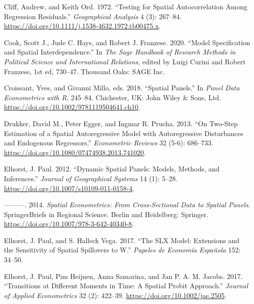 \documentclass[
  letterpaper,
]{scrbook}
\newlength{\cslhangindent}
\newlength{\cslentryspacingunit} %
\newenvironment{CSLReferences}[2] %
 {%
  \setlength{\parindent}{0pt}
  \ifodd #1
  \let\oldpar\par
  \def\par{\hangindent=\cslhangindent\oldpar}
  \fi
  \setlength{\parskip}{#2\cslentryspacingunit}
 }%
 {}
\begin{document}
\begin{CSLReferences}{1}{0}
\leavevmode{}%
Cliff, Andrew, and Keith Ord. 1972. {``Testing for {Spatial
Autocorrelation Among Regression Residuals}.''} \emph{Geographical
Analysis} 4 (3): 267--84.
\url{https://doi.org/10.1111/j.1538-4632.1972.tb00475.x}.

\leavevmode{}%
Cook, Scott J., Jude C. Hays, and Robert J. Franzese. 2020. {``Model
{Specification} and {Spatial Interdependence}.''} In \emph{The {Sage}
Handbook of Research Methods in Political Science and International
Relations}, edited by Luigi Curini and Robert Franzese, 1st ed, 730--47.
{Thousand Oaks}: {SAGE Inc}.

\leavevmode{}%
Croissant, Yves, and Givanni Millo, eds. 2018. {``Spatial {Panels}.''}
In \emph{Panel {Data Econometrics} with {R}}, 245--84. {Chichester, UK}:
{John Wiley \& Sons, Ltd}.
\url{https://doi.org/10.1002/9781119504641.ch10}.

\leavevmode{}%
Drukker, David M., Peter Egger, and Ingmar R. Prucha. 2013. {``On
{Two-Step Estimation} of a {Spatial Autoregressive Model} with
{Autoregressive Disturbances} and {Endogenous Regressors}.''}
\emph{Econometric Reviews} 32 (5-6): 686--733.
\url{https://doi.org/10.1080/07474938.2013.741020}.

\leavevmode{}%
Elhorst, J. Paul. 2012. {``Dynamic Spatial Panels: Models, Methods, and
Inferences.''} \emph{Journal of Geographical Systems} 14 (1): 5--28.
\url{https://doi.org/10.1007/s10109-011-0158-4}.

\leavevmode{}%
---------. 2014. \emph{Spatial {Econometrics}: {From Cross-Sectional
Data} to {Spatial Panels}}. {SpringerBriefs} in {Regional Science}.
{Berlin and Heidelberg}: {Springer}.
\url{https://doi.org/10.1007/978-3-642-40340-8}.

\leavevmode{}%
Elhorst, J. Paul, and S. Halleck Vega. 2017. {``The {SLX Model}:
{Extensions} and the {Sensitivity} of {Spatial Spillovers} to {W}.''}
\emph{Papeles de Economía Española} 152: 34--50.

\leavevmode{}%
Elhorst, J. Paul, Pim Heijnen, Anna Samarina, and Jan P. A. M. Jacobs.
2017. {``Transitions at {Different Moments} in {Time}: {A Spatial Probit
Approach}.''} \emph{Journal of Applied Econometrics} 32 (2): 422--39.
\url{https://doi.org/10.1002/jae.2505}.


\end{CSLReferences}
\end{document}

